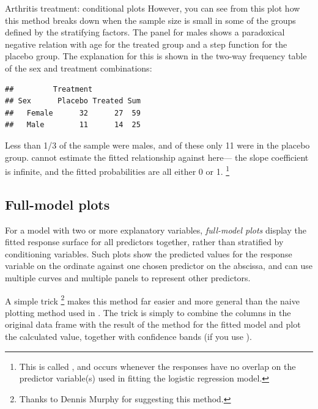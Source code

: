 \documentclass[11pt]{book}
\renewenvironment{knitrout}{\small\renewcommand{\baselinestretch}{.85}}{} %
\begin{document}
\begin{Example}{Arthritis treatment: conditional plots}
\begin{knitrout}
\end{knitrout}
\noindent However, you can see from this plot how this method breaks down when the sample size is small in some of the groups defined by  the stratifying factors. The panel for males shows a
paradoxical negative relation with age for the treated group and a step function for the 
placebo group.  The explanation for this is shown in the two-way frequency table
of the sex and treatment combinations:
\begin{knitrout}
\color{fgcolor}\begin{kframe}
\begin{alltt}
\hlstd{(}\hlstd{(}\hlopt{~} \hlopt{+}   \hlstd{)}
\end{alltt}
\begin{verbatim}
##         Treatment
## Sex      Placebo Treated Sum
##   Female      32      27  59
##   Male        11      14  25
\end{verbatim}
\end{kframe}
\end{knitrout}
Less than 1/3 of the sample were males, and of these only 11 were in the placebo group.
 cannot estimate the fitted relationship against  here--- the slope
coefficient is infinite, and the fitted probabilities are all either 0 or 1.%
\footnote{
This is called ,  and occurs whenever the responses have no
overlap on the predictor variable(s) used in fitting the logistic regression model.
}

\end{Example}


\subsection{Full-model plots}\label{sec:fullplots}
For a model with two or more explanatory variables, \emph{full-model plots}
display the fitted response surface for all predictors together, rather than
stratified by conditioning variables.
Such plots show the predicted values for the response variable on the ordinate
against one chosen predictor on the abscissa, and can use multiple curves
and multiple panels to represent other predictors.

A simple \R trick%
\footnote{Thanks to Dennis Murphy for suggesting this method.}
makes this method far easier and more general than the naive plotting method
used in .  The trick is simply to combine the columns in the
original data frame with the result of the  method for the fitted model
and plot the calculated  value, together with confidence bands
(if you use ).
\end{document}
